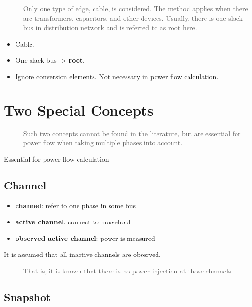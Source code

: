 \documentclass[
]{book}
\providecommand{\tightlist}{%
  \setlength{\itemsep}{0pt}\setlength{\parskip}{0pt}}
\begin{document}
\begin{quote}
Only one type of edge, cable, is considered. The method applies when there
are transformers, capacitors, and other devices. Usually, there is one slack
bus in distribution network and is referred to as root here.
\end{quote}

\begin{itemize}
\tightlist
\item
  Cable.
\item
  One slack bus -\textgreater{} \textbf{root}.
\item
  Ignore conversion elements. Not necessary in power flow calculation.
\end{itemize}

\hypertarget{concepts}{%
\section{Two Special Concepts}\label{concepts}}

\begin{quote}
Such two concepts cannot be found in the literature, but are essential for
power flow when taking multiple phases into account.
\end{quote}

Essential for power flow calculation.

\hypertarget{channel}{%
\subsection*{Channel}\label{channel}}

\begin{itemize}
\tightlist
\item
  \textbf{channel}: refer to one phase in some bus
\item
  \textbf{active channel}: connect to household
\item
  \textbf{observed active channel}: power is measured
\end{itemize}

It is assumed that all inactive channels are observed.

\begin{quote}
That is, it is known that there is no power injection at those channels.
\end{quote}

\hypertarget{snapshot}{%
\subsection*{Snapshot}\label{snapshot}}
\end{document}
